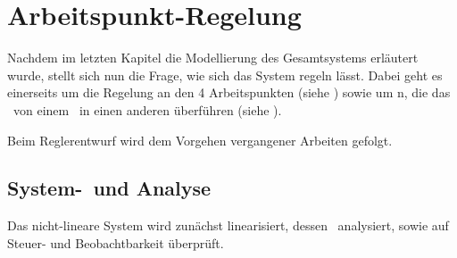 \chapter{Arbeitspunkt-Regelung}\label{cha:apr}

Nachdem im letzten Kapitel die Modellierung des Gesamtsystems erläutert wurde, stellt sich nun die Frage, wie sich das System regeln lässt. Dabei geht es einerseits um die Regelung an den 4 Arbeitspunkten (siehe ) sowie um \traj n, die das \dpd\ von einem \ap\ in einen anderen überführen (siehe ).

Beim Reglerentwurf wird dem Vorgehen vergangener Arbeiten gefolgt. 


\section{System-\lin\ und Analyse}%

Das nicht-lineare System wird zunächst linearisiert, dessen \ewe\ analysiert, sowie auf Steuer- und Beobachtbarkeit überprüft.

\subsection{\lin}\label{sec:lin}

